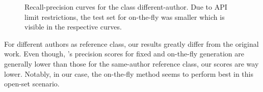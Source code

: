 \begin{figure}[htbp]
  \centering
  \begin{subfigure}[b]{0.48\textwidth}
    \centering
    
    \caption{\dataBlog{}}
    \label{fig:blog_different_author}
  \end{subfigure}
  \hfill
  \begin{subfigure}[b]{0.48\textwidth}
    \centering
    
    \caption{\dataStudent{}}
    \label{fig:student_essays_different_author}
  \end{subfigure}
  \caption{Recall-precision curves for the class different-author. Due to API limit restrictions, the test set for on-the-fly was smaller which is visible in the respective curves.}
  \label{fig:different_authors}
\end{figure}

For different authors as reference class, our results greatly differ from the original work.
Even though, \citet{koppel_determining_2014}'s precision scores for fixed and on-the-fly \imp{} generation are generally lower than those for the same-author reference class, our scores are way lower.
Notably, in our case, the on-the-fly method seems to perform best in this open-set scenario.
